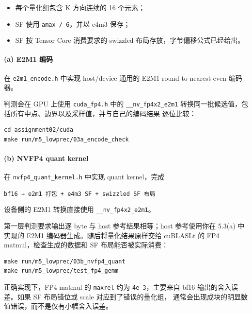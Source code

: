 \documentclass[11pt,a4paper,fontset=fandol]{ctexart}
\providecommand{\tightlist}{\setlength{\itemsep}{0pt}\setlength{\parskip}{0pt}}
\begin{document}
\begin{itemize}
\tightlist
\item
  每个量化组包含 K 方向连续的 16 个元素；
\item
  SF 使用 \texttt{amax\ /\allowbreak{}\ 6}，并以 e4m3 保存；
\item
  SF 按 Tensor Core 消费要求的 swizzled 布局存放，字节偏移公式已经给出。
\end{itemize}

\paragraph{(a) E2M1 编码}\label{a-e2m1-ux7f16ux7801}

在 \texttt{e2m1\_\allowbreak{}encode.\allowbreak{}h} 中实现 host/device
通用的 E2M1 round-to-nearest-even 编码器。

判测会在 GPU 上使用 \texttt{cuda\_\allowbreak{}fp4.\allowbreak{}h} 中的
\texttt{\_\allowbreak{}\_\allowbreak{}nv\_\allowbreak{}fp4x2\_\allowbreak{}e2m1}
转换同一批候选值，包括所有中点、边界以及采样值，并与自己的编码结果
逐位比较：

\begin{verbatim}
cd assignment02/cuda
make run/m5_lowprec/03a_encode_check
\end{verbatim}

\paragraph{(b) NVFP4 quant kernel}\label{b-nvfp4-quant-kernel}

在
\texttt{nvfp4\_\allowbreak{}quant\_\allowbreak{}kernel.\allowbreak{}h}
中实现 quant kernel，完成

\texttt{bf16\ →\ e2m1\ 打包\ +\ e4m3\ SF\ +\ swizzled\ SF\ 布局}

设备侧的 E2M1 转换直接使用
\texttt{\_\allowbreak{}\_\allowbreak{}nv\_\allowbreak{}fp4x2\_\allowbreak{}e2m1}。

第一层判测要求输出逐 byte 与 host 参考结果相等；host 参考使用你在 5.3(a)
中实现的 E2M1 编码器生成。随后将量化结果原样交给 cuBLASLt 的 FP4
matmul，检查生成的数据和 SF 布局能否被实际消费：

\begin{verbatim}
make run/m5_lowprec/03b_nvfp4_quant
make run/m5_lowprec/test_fp4_gemm
\end{verbatim}

正确实现下，FP4 matmul 的 \texttt{maxrel} 约为
\texttt{4e-\allowbreak{}3}，主要来自 bf16 输出的舍入误差。如果 SF
布局错位或 scale 对应到了错误的量化组，
通常会出现成块的明显数值错误，而不是仅有小幅舍入误差。
\end{document}
